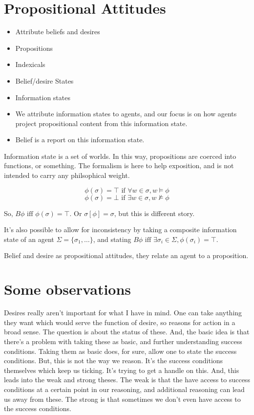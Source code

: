 \documentclass[10pt]{article}
\begin{document}
\section{Propositional Attitudes}
\label{sec:prop-attit}


\begin{itemize}
\item Attribute beliefs and desires
\item Propositions
\item Indexicals
\item Belief/desire States
\item Information states
\item We attribute information states to agents, and our focus is on how agents project propositional content from this information state.
\item Belief is a report on this information state.
\end{itemize}

Information state is a set of worlds.
In this way, propositions are coerced into functions, or something.
The formalism is here to help exposition, and is not intended to carry any philsophical weight.

\[\phi(\sigma) = \top \text{ if } \forall w \in \sigma, w \vDash \phi\]
\[\phi(\sigma) = \bot \text{ if } \exists w \in \sigma, w \nvDash \phi\]

So, \(B\phi \text{ iff } \phi(\sigma) = \top\).
Or \(\sigma[\phi] = \sigma\), but this is different story.

It's also possible to allow for inconsistency by taking a composite information state of an agent \(\Sigma = \{\sigma_{1}, \dots\}\), and stating \(B\phi \text{ iff } \exists \sigma_{i} \in \Sigma, \phi(\sigma_{i}) = \top\).





Belief and desire as propositional attitudes, they relate an agent to a proposition.


\section{Some observations}
\label{sec:some-observations}

Desires really aren't important for what I have in mind.
One can take anything they want which would serve the function of desire, so reasons for action in a broad sense.
The question is about the status of these.
And, the basic idea is that there's a problem with taking these as basic, and further understanding success conditions.
Taking them as basic does, for sure, allow one to state the success conditions.
But, this is not the way we reason.
It's the success conditions themselves which keep us ticking.
It's trying to get a handle on this.
And, this leads into the weak and strong theses.
The weak is that the have access to success conditions at a certain point in our reasoning, and additional reasoning can lead us away from these.
The strong is that sometimes we don't even have access to the success conditions.
\end{document}
